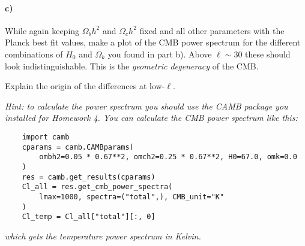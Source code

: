 \documentclass[12pt]{article}
\begin{document}
\paragraph{c)} While again keeping $\Omega_b h^2$ and $\Omega_c h^2$ fixed and all other parameters with the Planck best fit values, make a plot of the CMB power spectrum for the different combinations of $H_0$ and $\Omega_k$ you found in part b). Above $\ell \sim 30$ these should look indistinguishable. This is the \emph{geometric degeneracy} of the CMB.

Explain the origin of the differences at low-$\ell$.

\noindent \emph{Hint: to calculate the power spectrum you should use the CAMB package you installed for Homework 4. You can calculate the CMB power spectrum like this:}
\begin{verbatim}
    import camb
    cparams = camb.CAMBparams(
        ombh2=0.05 * 0.67**2, omch2=0.25 * 0.67**2, H0=67.0, omk=0.0
    )
    res = camb.get_results(cparams)
    Cl_all = res.get_cmb_power_spectra(
        lmax=1000, spectra=("total",), CMB_unit="K"
    )
    Cl_temp = Cl_all["total"][:, 0]
\end{verbatim}
\emph{which gets the temperature power spectrum in Kelvin.}
\end{document}
